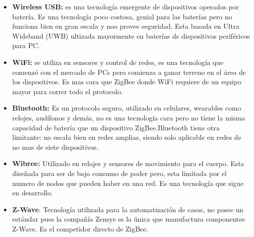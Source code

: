 \documentclass[10pt,journal,compsoc]{IEEEtran}
\begin{document}
\begin{itemize}
  \item \textbf{Wireless USB:} es una tecnología emergente de dispositivos operados por batería. Es una tecnología poco costosa, genial para las baterías pero no funciona bien en gran escala y noo provee seguridad. Esta basada en Ultra Wideband (UWB) ultizada mayormente en baterías de dispositivos periféricos para PC.
  \item \textbf{WiFi:} se utiliza en sensores y control de redes, es una tecnología que comenzó con el mercado de PCs pero comienza a ganar terreno en el área de los dispositivos. Es mas cara que ZigBee donde WiFi requiere de un equipo mayor para correr todo el protocolo. 
  \item \textbf{Bluetooth:} Es un protocolo seguro, utilizado en celulares, wearables como relojes, audífonos y demás, no es una tecnología cara  pero no tiene la misma capacidad de batería que un dispositivo ZigBee.Bluetooth tiene otra limitante: no escala bien en redes amplias, siendo solo aplicable en redes de no mas de siete dispositivos.
  \item \textbf{Wibree:} Utilizado en relojes y sensores de movimiento para el cuerpo. Esta diseñada para ser de bajo consumo de poder pero, esta limitada por el numero de nodos que pueden haber en una red. Es una tecnología que sigue en desarrollo. 
  \item \textbf{Z-Wave}: Tecnología utilizada para la automatización de casas, no posee un estándar pues la compañía Zensys es la única que manufactura componentes Z-Wave. Es el competidor directo de ZigBee. 
\end{itemize}




%
%
\end{document}
